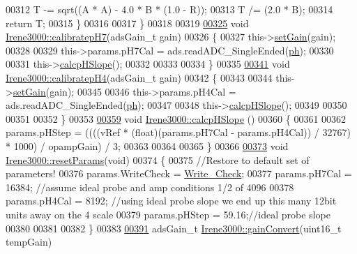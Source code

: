 \begin{DoxyCode}
00312     T -= sqrt((A * A) - 4.0 * B * (1.0 - R));
00313     T /= (2.0 * B);
00314     \textcolor{keywordflow}{return} T;
00315   \}
00316 
00317 \}
00318 
00319 
\hyperlink{class_irene3000_a2e810ddfa8b95eaa2446a408761c6bdc}{00325} \textcolor{keywordtype}{void} \hyperlink{class_irene3000_a2e810ddfa8b95eaa2446a408761c6bdc}{Irene3000::calibratepH7}(adsGain\_t gain)
00326 \{
00327     this->\hyperlink{class_irene3000_aff7c5da186b388e7272e63ff88a20c34}{setGain}(gain);
00328         
00329     this->params.pH7Cal = ads.readADC\_SingleEnded(\hyperlink{_irene3000_8h_af771ceafe0e6524dd8497d4305dfe778}{ph});
00330  
00331     this->\hyperlink{class_irene3000_a81f6a79e546679692053f7ac1af49613}{calcpHSlope}();
00332 
00333 
00334 \}
00335 
\hyperlink{class_irene3000_a9772eeea2305fad6236a82e33e93892e}{00341} \textcolor{keywordtype}{void} \hyperlink{class_irene3000_a9772eeea2305fad6236a82e33e93892e}{Irene3000::calibratepH4}(adsGain\_t gain)
00342 \{
00343 
00344   this->\hyperlink{class_irene3000_aff7c5da186b388e7272e63ff88a20c34}{setGain}(gain);
00345         
00346   this->params.pH4Cal =  ads.readADC\_SingleEnded(\hyperlink{_irene3000_8h_af771ceafe0e6524dd8497d4305dfe778}{ph});
00347  
00348   this->\hyperlink{class_irene3000_a81f6a79e546679692053f7ac1af49613}{calcpHSlope}();
00349 
00350 
00351 
00352 \}
00353 
\hyperlink{class_irene3000_a81f6a79e546679692053f7ac1af49613}{00359} \textcolor{keywordtype}{void} \hyperlink{class_irene3000_a81f6a79e546679692053f7ac1af49613}{Irene3000::calcpHSlope} ()
00360 \{
00361 
00362   params.pHStep = ((((vRef * (float)(params.pH7Cal - params.pH4Cal)) / 32767) * 1000) / opampGain) / 3;
00363 
00364  
00365 \}
00366 
\hyperlink{class_irene3000_a0fba280e8b7c881307efa31281aa691d}{00373} \textcolor{keywordtype}{void} \hyperlink{class_irene3000_a0fba280e8b7c881307efa31281aa691d}{Irene3000::resetParams}(\textcolor{keywordtype}{void})
00374 \{
00375   \textcolor{comment}{//Restore to default set of parameters!}
00376   params.WriteCheck = \hyperlink{_irene3000_8h_a9fa3b8fd890fde289060ee254cd273d5}{Write\_Check};
00377   params.pH7Cal = 16384; \textcolor{comment}{//assume ideal probe and amp conditions 1/2 of 4096}
00378   params.pH4Cal = 8192; \textcolor{comment}{//using ideal probe slope we end up this many 12bit units away on the 4 scale}
00379   params.pHStep = 59.16;\textcolor{comment}{//ideal probe slope}
00380 
00381   
00382 \}
00383 
\hyperlink{class_irene3000_abcad62d1201a59f8dd3ba87048002728}{00391} adsGain\_t \hyperlink{class_irene3000_abcad62d1201a59f8dd3ba87048002728}{Irene3000::gainConvert}(uint16\_t tempGain)

\end{DoxyCode}
